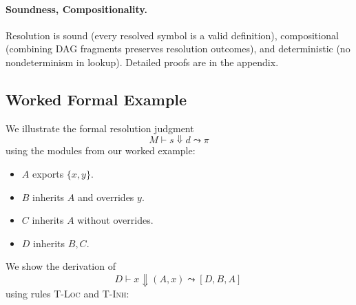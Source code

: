 \documentclass[sigplan,screen]{acmart}
\begin{document}
\paragraph{Soundness, Compositionality.} 
Resolution is sound (every resolved symbol is a valid definition), compositional (combining DAG fragments preserves resolution outcomes), and deterministic (no nondeterminism in lookup). Detailed proofs are in the appendix.

\subsection{Worked Formal Example}
\label{sec:worked-formal-example}

We illustrate the formal resolution judgment
\[
	M \vdash s \Downarrow d \leadsto \pi
\]
using the modules from our worked example:

\begin{itemize}
	\item $A$ exports $\{x,y\}$.
	\item $B$ inherits $A$ and overrides $y$.
	\item $C$ inherits $A$ without overrides.
	\item $D$ inherits $B,C$.
\end{itemize}

We show the derivation of
\[
  D \vdash x \Downarrow (A,x) \leadsto [D,B,A]\,
\]
using rules \textsc{T-Loc} and \textsc{T-Inh}:

\begin{mathpar}
\end{mathpar}

\begin{mathpar}
\end{mathpar}

\begin{mathpar}
\end{mathpar}
\end{document}
